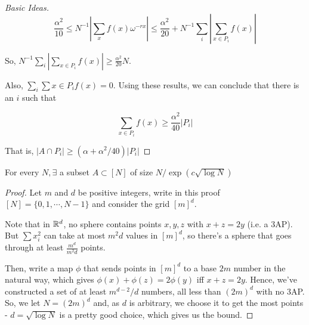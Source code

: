 \documentclass[a4paper]{article}
\begin{document}
{\begin{proof}[Basic Ideas]
	$$\frac{\alpha^2}{10}\leq N^{-1}\left|\sum_xf(x)\omega^{-rx}\right|\leq\frac{\alpha^2}{20}+N^{-1}\sum_{i}\left|\sum_{x\in P_i}f(x)\right|$$
	
	So, $N^{-1}\sum_{i}\left|\sum_{x\in P_i}f(x)\right|\geq\frac{\alpha^2}{20}N$.
	
	Also, $\sum_{i}\sum{x\in P_i}f(x)=0$. Using these results, we can conclude that there is an $i$ such that
	
	$$\sum_{x\in P_i}f(x)\geq\frac{\alpha^2}{40}\left|P_i\right|$$
	
	That is, $\left|A\cap P_i\right|\geq\left(\alpha+\alpha^2/40\right)\left|P_i\right|$
\end{proof}

\begin{thm}[Behrend, 1947]
	For every $N, \exists$ a subset $A\subset[N]$ of size $N/\exp\left(c\sqrt{\log N}\right)$
\end{thm}
\begin{proof}
	Let $m$ and $d$ be positive integers, write in this proof $[N]=\{0,1,\cdots,N-1\}$ and consider the grid $[m]^d$.
	
	Note that in $\mathbb{R}^d$, no sphere contains points $x,y,z$ with $x+z=2y$ (i.e. a 3AP). But $\sum x_i^2$ can take at most $m^2d$ values in $[m]^d$, so there's a sphere that goes through at least $\frac{m^d}{m^2d}$ points.
	
	Then, write a map $\phi$ that sends points in $[m]^d$ to a base $2m$ number in the natural way, which gives $\phi(x)+\phi(z)=2\phi(y)$ iff $x+z=2y$. Hence, we've constructed a set of at least $m^{d-2}/d$ numbers, all less than $(2m)^d$ with no 3AP. So, we let $N=(2m)^d$ and, as $d$ is arbitrary, we choose it to get the most points - $d=\sqrt{\log N}$ is a pretty good choice, which gives us the bound.
\end{proof}

}
\end{document}
